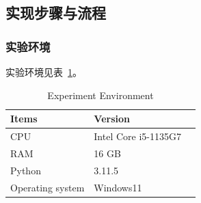 \documentclass[12pt]{article}
\begin{document}
\subsection{实现步骤与流程}
\subsubsection{实验环境}
实验环境见表~\ref{tab:indicators}。

\begin{table}[!t]
  \caption{Experiment Environment}
  \label{tab:indicators}
  \centering
  \begin{tabular}{m{5cm}<{\centering}m{5cm}<{\centering}m{4cm}<{\centering}}
    \toprule
    \textbf{Items}   & \textbf{Version}     \\[\medskipamount]
    \midrule
    CPU              & Intel Core i5-1135G7 \\[\medskipamount]
    RAM              & 16 GB                \\[\medskipamount]
    Python           & 3.11.5               \\[\medskipamount]
    Operating system & Windows11            \\[\medskipamount]
    \bottomrule
  \end{tabular}
\end{table}
\end{document}
